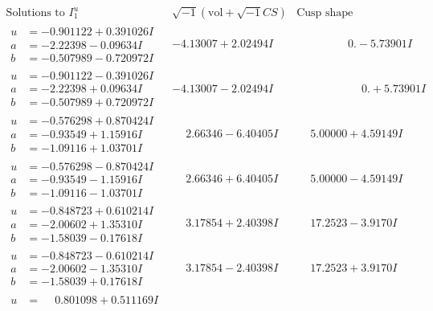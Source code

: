 \documentclass[1p]{elsarticle_modified}
\theoremstyle{definition}
\newcommand{\I}{\sqrt{-1}}
\begin{document}
$$\begin{array}{c|c|c}  
\text{Solutions to }I^u_{1}& \I (\text{vol} + \sqrt{-1}CS) & \text{Cusp shape}\\
 \hline 
\begin{aligned}
u &= -0.901122 + 0.391026 I \\
a &= -2.22398 - 0.09634 I \\
b &= -0.507989 - 0.720972 I\end{aligned}
 & -4.13007 + 2.02494 I & \phantom{-0.000000 } 0. - 5.73901 I \\ \hline\begin{aligned}
u &= -0.901122 - 0.391026 I \\
a &= -2.22398 + 0.09634 I \\
b &= -0.507989 + 0.720972 I\end{aligned}
 & -4.13007 - 2.02494 I & \phantom{-0.000000 -}0. + 5.73901 I \\ \hline\begin{aligned}
u &= -0.576298 + 0.870424 I \\
a &= -0.93549 + 1.15916 I \\
b &= -1.09116 + 1.03701 I\end{aligned}
 & \phantom{-}2.66346 - 6.40405 I & \phantom{-}5.00000 + 4.59149 I \\ \hline\begin{aligned}
u &= -0.576298 - 0.870424 I \\
a &= -0.93549 - 1.15916 I \\
b &= -1.09116 - 1.03701 I\end{aligned}
 & \phantom{-}2.66346 + 6.40405 I & \phantom{-}5.00000 - 4.59149 I \\ \hline\begin{aligned}
u &= -0.848723 + 0.610214 I \\
a &= -2.00602 + 1.35310 I \\
b &= -1.58039 - 0.17618 I\end{aligned}
 & \phantom{-}3.17854 + 2.40398 I & \phantom{-}17.2523 - 3.9170 I \\ \hline\begin{aligned}
u &= -0.848723 - 0.610214 I \\
a &= -2.00602 - 1.35310 I \\
b &= -1.58039 + 0.17618 I\end{aligned}
 & \phantom{-}3.17854 - 2.40398 I & \phantom{-}17.2523 + 3.9170 I \\ \hline\begin{aligned}
u &= \phantom{-}0.801098 + 0.511169 I \\

\end{aligned}
\end{array}$$
\end{document}
